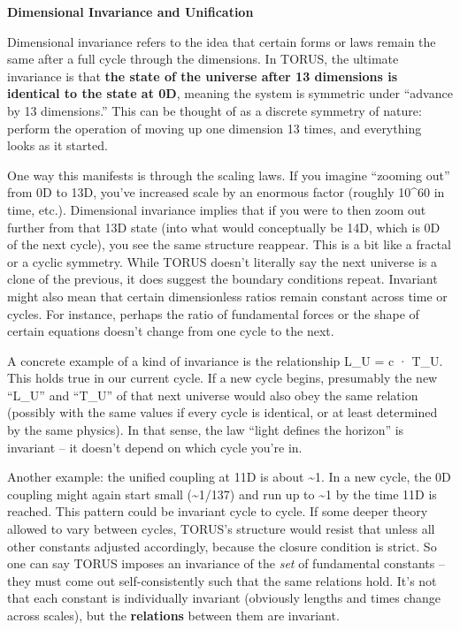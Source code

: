 \documentclass[
]{article}
\begin{document}
\textbf{Dimensional Invariance and Unification}

Dimensional invariance refers to the idea that certain forms or laws
remain the same after a full cycle through the dimensions. In TORUS, the
ultimate invariance is that \textbf{the state of the universe after 13
dimensions is identical to the state at 0D}, meaning the system is
symmetric under ``advance by 13 dimensions.'' This can be thought of as
a discrete symmetry of nature: perform the operation of moving up one
dimension 13 times, and everything looks as it started\hspace{0pt}.

One way this manifests is through the scaling laws. If you imagine
``zooming out'' from 0D to 13D, you've increased scale by an enormous
factor (roughly 10\^{}60 in time, etc.). Dimensional invariance implies
that if you were to then zoom out further from that 13D state (into what
would conceptually be 14D, which is 0D of the next cycle), you see the
same structure reappear. This is a bit like a fractal or a cyclic
symmetry. While TORUS doesn't literally say the next universe is a clone
of the previous, it does suggest the boundary conditions repeat.
Invariant might also mean that certain dimensionless ratios remain
constant across time or cycles. For instance, perhaps the ratio of
fundamental forces or the shape of certain equations doesn't change from
one cycle to the next.

A concrete example of a kind of invariance is the relationship
L_{U}{} = c ·
T_{U}. This holds true
in our current cycle. If a new cycle begins, presumably the new
``L_{U}'' and
``T_{U}'' of that next
universe would also obey the same relation (possibly with the same
values if every cycle is identical, or at least determined by the same
physics). In that sense, the law ``light defines the horizon'' is
invariant -- it doesn't depend on which cycle you're in.

Another example: the unified coupling at 11D is about \textasciitilde1.
In a new cycle, the 0D coupling might again start small
(\textasciitilde1/137) and run up to \textasciitilde1 by the time 11D is
reached. This pattern could be invariant cycle to cycle. If some deeper
theory allowed \alpha to vary between cycles, TORUS's structure would resist
that unless all other constants adjusted accordingly, because the
closure condition is strict. So one can say TORUS imposes an invariance
of the \emph{set} of fundamental constants -- they must come out
self-consistently such that the same relations hold. It's not that each
constant is individually invariant (obviously lengths and times change
across scales), but the \textbf{relations} between them are invariant.
\end{document}
